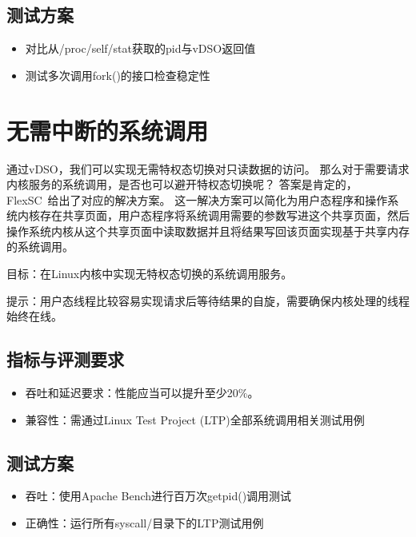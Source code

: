 \subsection*{测试方案}
\begin{itemize}
    \item 对比从/proc/self/stat获取的pid与vDSO返回值
    \item 测试多次调用fork()的接口检查稳定性
\end{itemize}

\section{无需中断的系统调用}
通过vDSO，我们可以实现无需特权态切换对只读数据的访问。
那么对于需要请求内核服务的系统调用，是否也可以避开特权态切换呢？
答案是肯定的，FlexSC~\cite{soares2010flexsc}给出了对应的解决方案。
这一解决方案可以简化为用户态程序和操作系统内核存在共享页面，用户态程序将系统调用需要的参数写进这个共享页面，然后操作系统内核从这个共享页面中读取数据并且将结果写回该页面实现基于共享内存的系统调用。

目标：在Linux内核中实现无特权态切换的系统调用服务。

提示：用户态线程比较容易实现请求后等待结果的自旋，需要确保内核处理的线程始终在线。

\subsection*{指标与评测要求}
\begin{itemize}
    \item 吞吐和延迟要求：性能应当可以提升至少20\%。
    \item 兼容性：需通过Linux Test Project (LTP)全部系统调用相关测试用例
\end{itemize}


\subsection*{测试方案}
\begin{itemize}
    \item 吞吐：使用Apache Bench进行百万次getpid()调用测试
    \item 正确性：运行所有syscall/目录下的LTP测试用例
\end{itemize}
